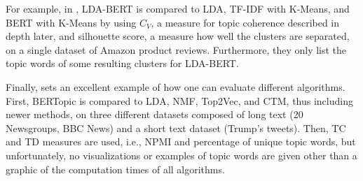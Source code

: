 \documentclass[11pt]{article}
\begin{document}
For example, in \citet{lda-bert}, LDA-BERT is compared to LDA, TF-IDF with K-Means, and BERT with K-Means by using $C_V$, a measure for topic coherence described in depth later, and silhouette score, a measure how well the clusters are separated, on a single dataset of Amazon product reviews. Furthermore, they only list the topic words of some resulting clusters for LDA-BERT. 

Finally, \citet{bertopic} sets an excellent example of how one can evaluate different algorithms. First, BERTopic is compared to LDA, NMF, Top2Vec, and CTM, thus including newer methods, on three different datasets composed of long text (20 Newsgroups, BBC News) and a short text dataset (Trump's tweets). Then, TC and TD measures are used, i.e., NPMI and percentage of unique topic words, but unfortunately, no visualizations or examples of topic words are given other than a graphic of the computation times of all algorithms. 
\end{document}
